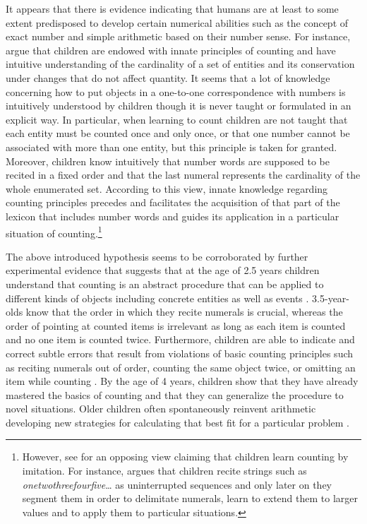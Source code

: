 It appears that there is evidence indicating that humans are at least to some extent predisposed to develop certain numerical abilities such as the concept of exact number and simple arithmetic based on their number sense. For instance, \citet{gelman_gallistel1978child} argue that children are endowed with innate principles of counting and have intuitive understanding of the cardinality of a set of entities and its conservation under changes that do not affect quantity. It seems that a lot of knowledge concerning how to put objects in a one-to-one correspondence with numbers is intuitively understood by children though it is never taught or formulated in an explicit way. In particular, when learning to count children are not taught that each entity must be counted once and only once, or that one number cannot be associated with more than one entity, but this principle is taken for granted. Moreover, children know intuitively that number words are supposed to be recited in a fixed order and that the last numeral represents the cardinality of the whole enumerated set. According to this view, innate knowledge regarding counting principles precedes and facilitates the acquisition of that part of the lexicon that includes number words and guides its application in a particular situation of counting.\footnote{However, see \citet{fuson1988springer} for an opposing view claiming that children learn counting by imitation. For instance, \citeauthor{fuson1988springer} argues that children recite strings such as \textit{onetwothreefourfive}\dots {} as uninterrupted sequences and only later on they segment them in order to delimitate numerals, learn to extend them to larger values and to apply them to particular situations.}

The above introduced hypothesis seems to be corroborated by further experimental evidence that suggests that at the age of 2.5 years children understand that counting is an abstract procedure that can be applied to different kinds of objects including concrete entities as well as events \citep{wynn1990children}. 3.5-year-olds know that the order in which they recite numerals is crucial, whereas the order of pointing at counted items is irrelevant as long as each item is counted and no one item is counted twice. Furthermore, children are able to indicate and correct subtle errors that result from violations of basic counting principles such as reciting numerals out of order, counting the same object twice, or omitting an item while counting \citep{gelman_meck1983preschoolers,gelman_meck_merkin1986young}. By the age of 4 years, children show that they have already mastered the basics of counting and that they can generalize the procedure to novel situations. Older children often spontaneously reinvent arithmetic developing new strategies for calculating that best fit for a particular problem \citep[p. 119]{dehaene1997number}.

